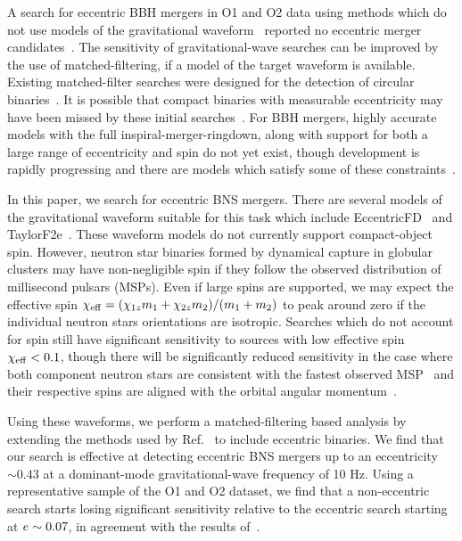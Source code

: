 A search for eccentric BBH mergers in O1 and O2 data using methods which do not use models of the gravitational waveform~\cite{Klimenko:2008fu,Klimenko:2015ypf,Tiwari:2015gal} reported no eccentric merger candidates~\cite{Salemi:2019owp}. The sensitivity of gravitational-wave searches can be improved by the use of matched-filtering, if a model of the target waveform is available. Existing matched-filter searches were designed for the detection of circular  binaries~\cite{DalCanton:2017ala,Usman:2015kfa,Venumadhav:2019tad}. It is possible that compact binaries with measurable eccentricity may have been missed by these initial searches~\cite{Brown:2009ng,Huerta:2013qb}. For BBH mergers, highly accurate models with the full inspiral-merger-ringdown, along with support for both a large range of eccentricity and spin do not yet exist, though development is rapidly progressing and there are models which satisfy some of these constraints~\cite{Huerta:2017kez,Cao:2017ndf,Hinderer:2017jcs,Hinder:2017sxy,Ireland:2019tao}.

In this paper, we search for eccentric BNS mergers.  There are several models of the gravitational waveform suitable for this task which include EccentricFD~\cite{Huerta:2014eca} and TaylorF2e~\cite{Moore:2018kvz,Moore:2019xkm}. These waveform models do not currently support compact-object spin. However, neutron star binaries formed by dynamical capture in globular clusters may have non-negligible spin if they follow the observed distribution of millisecond pulsars (MSPs). Even if large spins are supported, we may expect the  effective spin $\chi_{\mathrm{eff}} = (\chi_{1z} m_1 + \chi_{2z} m_2)/(m_1+m_2)$ to peak around zero if the individual neutron stars orientations are isotropic. Searches which do not account for spin still have significant sensitivity to sources with low effective spin $\chi_{\mathrm{eff}} < 0.1$, though there will be significantly reduced sensitivity in the case where both component neutron stars are consistent with the fastest observed MSP~\cite{Hessels:2006ze} and their respective spins are aligned with the orbital angular momentum~\cite{Brown:2012gs}.

Using these waveforms, we perform a matched-filtering based analysis by extending the methods used by Ref.~\cite{Nitz:2018imz} to include eccentric binaries. We find that our search is effective at detecting eccentric BNS mergers up to an eccentricity \ecc~$\sim 0.43$ at a dominant-mode gravitational-wave frequency of 10 Hz. Using a representative sample of the O1 and O2 dataset, we find that a non-eccentric search starts losing significant sensitivity relative to the eccentric search starting at $e \sim 0.07$, in agreement with the results of~\cite{Huerta:2013qb,Moore:2019vjj}.

